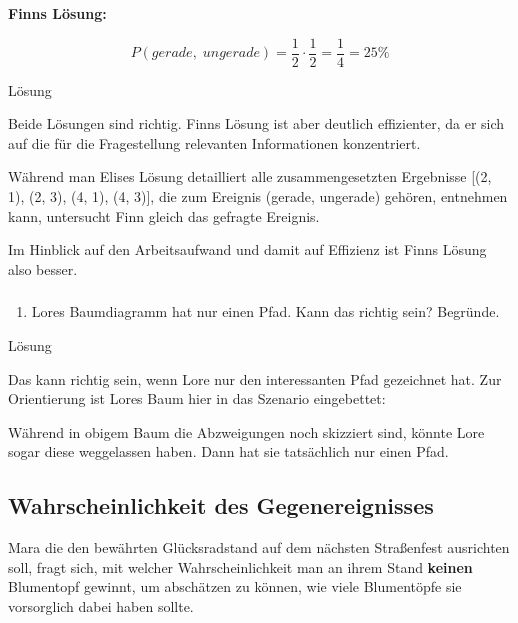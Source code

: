 \documentclass[
  ngerman,
]{book}
\providecommand{\tightlist}{%
  \setlength{\itemsep}{0pt}\setlength{\parskip}{0pt}}
\begin{document}
\textbf{Finns Lösung:}

\[P(gerade,\;ungerade)=\frac{1}{2} \cdot \frac{1}{2} = \frac{1}{4} = 25\%\]

Lösung

Beide Lösungen sind richtig. Finns Lösung ist aber deutlich effizienter, da er sich auf die für die Fragestellung relevanten Informationen konzentriert.

Während man Elises Lösung detailliert alle zusammengesetzten Ergebnisse {[}(2, 1), (2, 3), (4, 1), (4, 3){]}, die zum Ereignis (gerade, ungerade) gehören, entnehmen kann, untersucht Finn gleich das gefragte Ereignis.

Im Hinblick auf den Arbeitsaufwand und damit auf Effizienz ist Finns Lösung also besser.

\hypertarget{section-158}{%
\subsubsection*{}\label{section-158}}

\begin{enumerate}
\def\labelenumi{\alph{enumi})}
\setcounter{enumi}{1}
\tightlist
\item
  Lores Baumdiagramm hat nur einen Pfad. Kann das richtig sein? Begründe.
\end{enumerate}

Lösung

Das kann richtig sein, wenn Lore nur den interessanten Pfad gezeichnet hat. Zur Orientierung ist Lores Baum hier in das Szenario eingebettet:

Während in obigem Baum die Abzweigungen noch skizziert sind, könnte Lore sogar diese weggelassen haben. Dann hat sie tatsächlich nur einen Pfad.

\hypertarget{section-159}{%
\subsubsection*{}\label{section-159}}

\hypertarget{wahrscheinlichkeit-des-gegenereignisses}{%
\subsection{Wahrscheinlichkeit des Gegenereignisses}\label{wahrscheinlichkeit-des-gegenereignisses}}

Mara die den bewährten Glücksradstand auf dem nächsten Straßenfest ausrichten soll, fragt sich, mit welcher Wahrscheinlichkeit man an ihrem Stand \textbf{keinen} Blumentopf gewinnt, um abschätzen zu können, wie viele Blumentöpfe sie vorsorglich dabei haben sollte.
\end{document}
